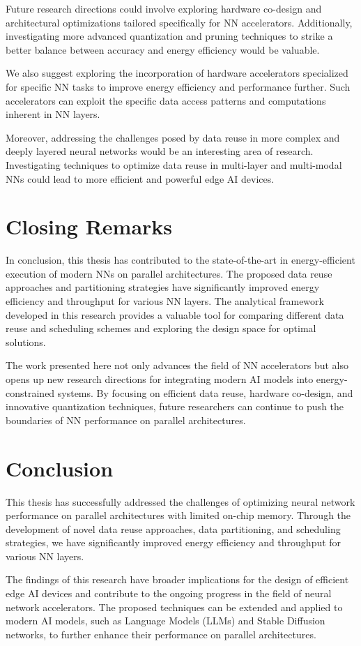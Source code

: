 Future research directions could involve exploring hardware co-design and architectural optimizations tailored specifically for NN accelerators. Additionally, investigating more advanced quantization and pruning techniques to strike a better balance between accuracy and energy efficiency would be valuable.

We also suggest exploring the incorporation of hardware accelerators specialized for specific NN tasks to improve energy efficiency and performance further. Such accelerators can exploit the specific data access patterns and computations inherent in NN layers.

Moreover, addressing the challenges posed by data reuse in more complex and deeply layered neural networks would be an interesting area of research. Investigating techniques to optimize data reuse in multi-layer and multi-modal NNs could lead to more efficient and powerful edge AI devices.
\section{Closing Remarks}
In conclusion, this thesis has contributed to the state-of-the-art in energy-efficient execution of modern NNs on parallel architectures. The proposed data reuse approaches and partitioning strategies have significantly improved energy efficiency and throughput for various NN layers. The analytical framework developed in this research provides a valuable tool for comparing different data reuse and scheduling schemes and exploring the design space for optimal solutions.

The work presented here not only advances the field of NN accelerators but also opens up new research directions for integrating modern AI models into energy-constrained systems. By focusing on efficient data reuse, hardware co-design, and innovative quantization techniques, future researchers can continue to push the boundaries of NN performance on parallel architectures.
\section{Conclusion}
This thesis has successfully addressed the challenges of optimizing neural network performance on parallel architectures with limited on-chip memory. Through the development of novel data reuse approaches, data partitioning, and scheduling strategies, we have significantly improved energy efficiency and throughput for various NN layers.

The findings of this research have broader implications for the design of efficient edge AI devices and contribute to the ongoing progress in the field of neural network accelerators. The proposed techniques can be extended and applied to modern AI models, such as Language Models (LLMs) and Stable Diffusion networks, to further enhance their performance on parallel architectures.

